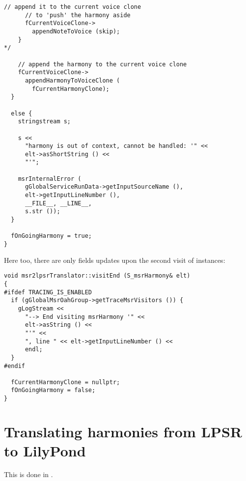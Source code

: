 \begin{lstlisting}[language=CPlusPlus]
      // append it to the current voice clone
      // to 'push' the harmony aside
      fCurrentVoiceClone->
        appendNoteToVoice (skip);
    }
*/

    // append the harmony to the current voice clone
    fCurrentVoiceClone->
      appendHarmonyToVoiceClone (
        fCurrentHarmonyClone);
  }

  else {
    stringstream s;

    s <<
      "harmony is out of context, cannot be handled: '" <<
      elt->asShortString () <<
      "'";

    msrInternalError (
      gGlobalServiceRunData->getInputSourceName (),
      elt->getInputLineNumber (),
      __FILE__, __LINE__,
      s.str ());
  }

  fOnGoingHarmony = true;
}
\end{lstlisting}

\pagebreak

Here too, there are only fields updates upon the second visit of  instances:
\begin{lstlisting}[language=CPlusPlus]
void msr2lpsrTranslator::visitEnd (S_msrHarmony& elt)
{
#ifdef TRACING_IS_ENABLED
  if (gGlobalMsrOahGroup->getTraceMsrVisitors ()) {
    gLogStream <<
      "--> End visiting msrHarmony '" <<
      elt->asString () <<
      "'" <<
      ", line " << elt->getInputLineNumber () <<
      endl;
  }
#endif

  fCurrentHarmonyClone = nullptr;
  fOnGoingHarmony = false;
}
\end{lstlisting}


\section{Translating harmonies from LPSR to LilyPond}

This is done in \lpsrToLilypond{}.

